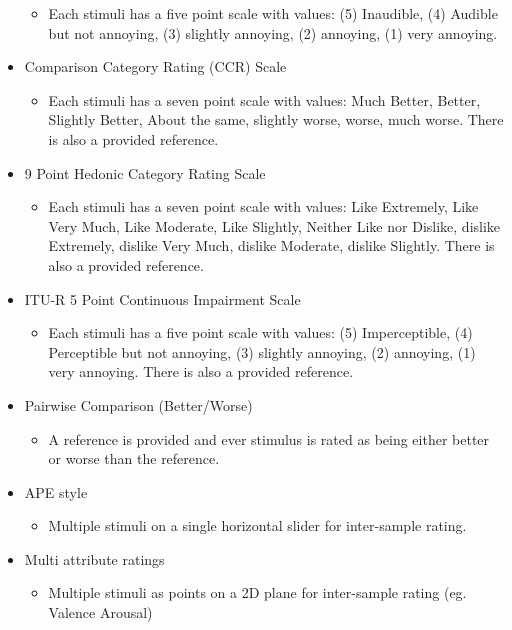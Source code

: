 \documentclass{sig-alternate}
\begin{document}
\begin{itemize}[noitemsep,nolistsep]
		\begin{itemize}
			\item Each stimuli has a five point scale with values: (5) Inaudible, (4) Audible but not annoying, (3) slightly annoying, (2) annoying, (1) very annoying.
		\end{itemize}
		\item Comparison Category Rating (CCR) Scale~\cite{rec1996p}
		\begin{itemize}
			\item Each stimuli has a seven point scale with values: Much Better, Better, Slightly Better, About the same, slightly worse, worse, much worse. There is also a provided reference.
		\end{itemize}
		\item 9 Point Hedonic Category Rating Scale~\cite{peryam1952advanced}
		\begin{itemize}
			\item Each stimuli has a seven point scale with values: Like Extremely, Like Very Much, Like Moderate, Like Slightly, Neither Like nor Dislike, dislike Extremely, dislike Very Much, dislike Moderate, dislike Slightly. There is also a provided reference.
			\end{itemize}
		\item ITU-R 5 Point Continuous Impairment Scale~\cite{rec1997bs}
		\begin{itemize}
			\item Each stimuli has a five point scale with values: (5) Imperceptible, (4) Perceptible but not annoying, (3) slightly annoying, (2) annoying, (1) very annoying. There is also a provided reference.
		\end{itemize}
		\item Pairwise Comparison (Better/Worse)~\cite{david1963method}
		\begin{itemize}
			\item A reference is provided and ever stimulus is rated as being either better or worse than the reference.
		\end{itemize}
		\item APE style \cite{ape}
		\begin{itemize}
			\item Multiple stimuli on a single horizontal slider for inter-sample rating.
		\end{itemize}
		\item Multi attribute ratings
		\begin{itemize}
			\item Multiple stimuli as points on a 2D plane for inter-sample rating (eg. Valence Arousal)

\end{itemize}
\end{itemize}
\end{document}
